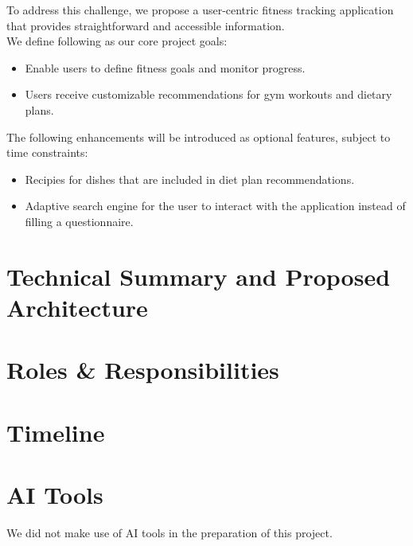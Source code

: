 \documentclass[a4paper,10pt]{article}
\begin{document}
To address this challenge, we propose a user-centric fitness tracking application that provides straightforward and accessible information. \\

We define following as our core project goals:

\begin{itemize}
    \item Enable users to define fitness goals and monitor progress.
    \item Users receive customizable recommendations for gym workouts and dietary plans.
\end{itemize}

The following enhancements will be introduced as optional features, subject to time constraints:
\begin{itemize}
    \item Recipies for dishes that are included in diet plan recommendations.
    \item Adaptive search engine for the user to interact with the application instead of filling a questionnaire.
\end{itemize}

\pagebreak

\section{Technical Summary and Proposed Architecture}

\section{Roles \& Responsibilities}

\section{Timeline}

\section{AI Tools}
We did not make use of AI tools in the preparation of this project.
\end{document}
